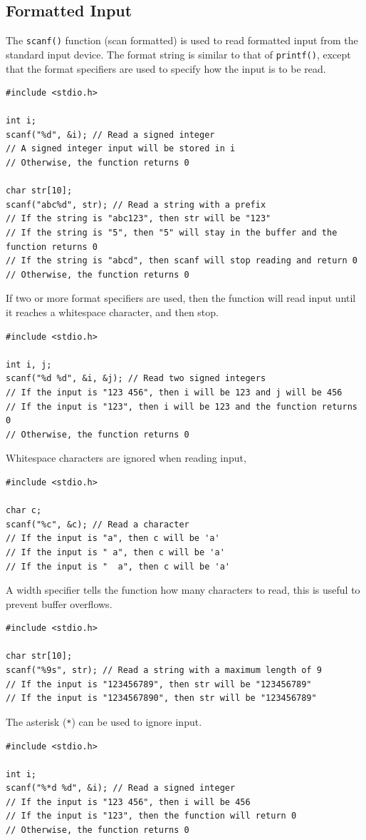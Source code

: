 \documentclass[a4paper]{report}
\begin{document}
\subsection{Formatted Input}
The \texttt{scanf()} function (scan formatted) is used to read formatted input from the standard input device. The format string is similar to that of \texttt{printf()},
except that the format specifiers are used to specify how the input is to be read.
\begin{verbatim}
#include <stdio.h>

int i;
scanf("%d", &i); // Read a signed integer
// A signed integer input will be stored in i
// Otherwise, the function returns 0

char str[10];
scanf("abc%d", str); // Read a string with a prefix
// If the string is "abc123", then str will be "123"
// If the string is "5", then "5" will stay in the buffer and the function returns 0
// If the string is "abcd", then scanf will stop reading and return 0
// Otherwise, the function returns 0
\end{verbatim}
If two or more format specifiers are used, then the function will read input until it reaches a whitespace character, and then stop.
\begin{verbatim}
#include <stdio.h>

int i, j;
scanf("%d %d", &i, &j); // Read two signed integers
// If the input is "123 456", then i will be 123 and j will be 456
// If the input is "123", then i will be 123 and the function returns 0
// Otherwise, the function returns 0
\end{verbatim}
Whitespace characters are ignored when reading input,
\begin{verbatim}
#include <stdio.h>

char c;
scanf("%c", &c); // Read a character
// If the input is "a", then c will be 'a'
// If the input is " a", then c will be 'a'
// If the input is "  a", then c will be 'a'
\end{verbatim}
A width specifier tells the function how many characters to read, this is useful to prevent buffer overflows.
\begin{verbatim}
#include <stdio.h>

char str[10];
scanf("%9s", str); // Read a string with a maximum length of 9
// If the input is "123456789", then str will be "123456789"
// If the input is "1234567890", then str will be "123456789"
\end{verbatim}
The asterisk (\texttt{*}) can be used to ignore input.
\begin{verbatim}
#include <stdio.h>

int i;
scanf("%*d %d", &i); // Read a signed integer
// If the input is "123 456", then i will be 456
// If the input is "123", then the function will return 0
// Otherwise, the function returns 0
\end{verbatim}
\end{document}
